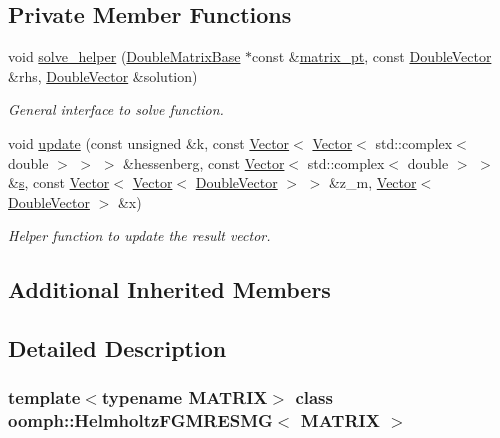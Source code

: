 \subsection*{Private Member Functions}
\begin{DoxyCompactItemize}
\item 
void \hyperlink{classoomph_1_1HelmholtzFGMRESMG_a8bfd5045cf99bbeaf94b69ede3ccf0ad}{solve\+\_\+helper} (\hyperlink{classoomph_1_1DoubleMatrixBase}{Double\+Matrix\+Base} $\ast$const \&\hyperlink{classoomph_1_1BlockPreconditioner_a9aac48fd53e579e6db8eeed58933a14b}{matrix\+\_\+pt}, const \hyperlink{classoomph_1_1DoubleVector}{Double\+Vector} \&rhs, \hyperlink{classoomph_1_1DoubleVector}{Double\+Vector} \&solution)
\begin{DoxyCompactList}\small\item\em General interface to solve function. \end{DoxyCompactList}\item 
void \hyperlink{classoomph_1_1HelmholtzFGMRESMG_ac6e87c2d59dcee71ce599dcbabae5445}{update} (const unsigned \&k, const \hyperlink{classoomph_1_1Vector}{Vector}$<$ \hyperlink{classoomph_1_1Vector}{Vector}$<$ std\+::complex$<$ double $>$ $>$ $>$ \&hessenberg, const \hyperlink{classoomph_1_1Vector}{Vector}$<$ std\+::complex$<$ double $>$ $>$ \&\hyperlink{cfortran_8h_ab7123126e4885ef647dd9c6e3807a21c}{s}, const \hyperlink{classoomph_1_1Vector}{Vector}$<$ \hyperlink{classoomph_1_1Vector}{Vector}$<$ \hyperlink{classoomph_1_1DoubleVector}{Double\+Vector} $>$ $>$ \&z\+\_\+m, \hyperlink{classoomph_1_1Vector}{Vector}$<$ \hyperlink{classoomph_1_1DoubleVector}{Double\+Vector} $>$ \&x)
\begin{DoxyCompactList}\small\item\em Helper function to update the result vector. \end{DoxyCompactList}\end{DoxyCompactItemize}
\subsection*{Additional Inherited Members}


\subsection{Detailed Description}
\subsubsection*{template$<$typename M\+A\+T\+R\+IX$>$\newline
class oomph\+::\+Helmholtz\+F\+G\+M\+R\+E\+S\+M\+G$<$ M\+A\+T\+R\+I\+X $>$}

